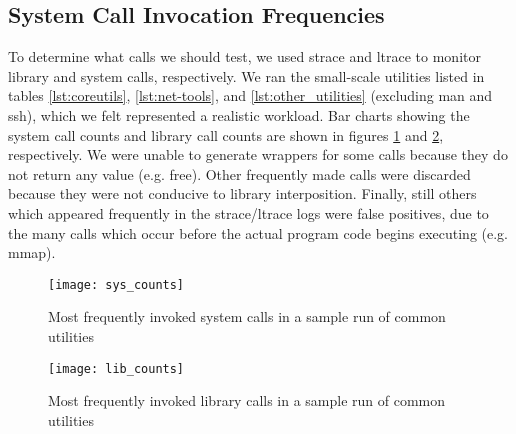 \subsection{System Call Invocation Frequencies}
To determine what calls we should test, we used strace and ltrace to monitor library and system calls, respectively. We ran the small-scale utilities listed in tables \ref{lst:coreutils}, \ref{lst:net-tools}, and \ref{lst:other_utilities} (excluding man and ssh), which we felt represented a realistic workload. Bar charts showing the system call counts and library call counts are shown in figures \ref{fig:sys_counts} and \ref{fig:lib_counts}, respectively. We were unable to generate wrappers for some calls because they do not return any value (e.g. free). Other frequently made calls were discarded because they were not conducive to library interposition. Finally, still others which appeared frequently in the strace/ltrace logs were false positives, due to the many calls which occur before the actual program code begins executing (e.g. mmap). \\
\begin{figure}
\centering
\texttt{[image: sys\_counts]}
\caption{Most frequently invoked system calls in a sample run of common utilities}
\label{fig:sys_counts}
\end{figure}

\begin{figure}
\centering
\texttt{[image: lib\_counts]}
\caption{Most frequently invoked library calls in a sample run of common utilities}
\label{fig:lib_counts}
\end{figure}
